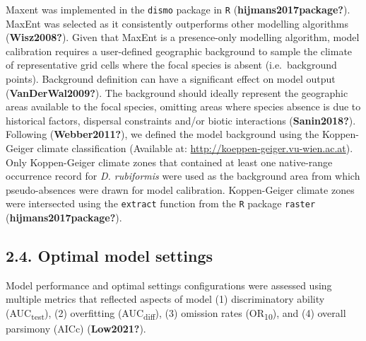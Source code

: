 \documentclass[12pt,]{article}
\begin{document}
Maxent was implemented in the \texttt{dismo} package in \texttt{R}
(\textbf{hijmans2017package?}). MaxEnt was selected as it consistently
outperforms other modelling algorithms (\textbf{Wisz2008?}). Given that
MaxEnt is a presence-only modelling algorithm, model calibration
requires a user-defined geographic background to sample the climate of
representative grid cells where the focal species is absent
(i.e.~background points). Background definition can have a significant
effect on model output (\textbf{VanDerWal2009?}). The background should
ideally represent the geographic areas available to the focal species,
omitting areas where species absence is due to historical factors,
dispersal constraints and/or biotic interactions (\textbf{Sanin2018?}).
Following (\textbf{Webber2011?}), we defined the model background using
the Koppen-Geiger climate classification (Available at:
\url{http://koeppen-geiger.vu-wien.ac.at}). Only Koppen-Geiger climate
zones that contained at least one native-range occurrence record for
\emph{D. rubiformis} were used as the background area from which
pseudo-absences were drawn for model calibration. Koppen-Geiger climate
zones were intersected using the \texttt{extract} function from the
\texttt{R} package \texttt{raster} (\textbf{hijmans2017package?}).

\hypertarget{optimal-model-settings}{%
\subsection{2.4. Optimal model settings}\label{optimal-model-settings}}

Model performance and optimal settings configurations were assessed
using multiple metrics that reflected aspects of model (1)
discriminatory ability (AUC\textsubscript{test}), (2) overfitting
(AUC\textsubscript{diff}), (3) omission rates (OR\textsubscript{10}),
and (4) overall parsimony (AICc) (\textbf{Low2021?}).
\end{document}

